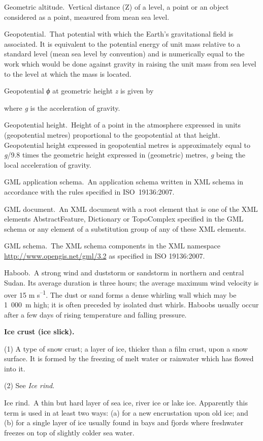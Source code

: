 Geometric altitude. Vertical distance (Z) of a level, a point or an object considered as a point, measured from mean sea level.

Geopotential. That potential with which the Earth's gravitational field is associated. It is equivalent to the potential energy of unit mass relative to a standard level (mean sea level by convention) and is numerically equal to the work which would be done against gravity in raising the unit mass from sea level to the level at which the mass is located.

Geopotential \emph{ϕ} at geometric height \emph{z} is given by

where \emph{g} is the acceleration of gravity.

Geopotential height. Height of a point in the atmosphere expressed in units (geopotential metres) proportional to the geopotential at that height. Geopotential height expressed in geopotential metres is approximately equal to \emph{g}/9.8 times the geometric height expressed in (geometric) metres, \emph{g} being the local acceleration of gravity.

GML application schema. An application schema written in XML schema in accordance with the rules specified in ISO~19136:2007.

GML document. An XML document with a root element that is one of the XML elements AbstractFeature, Dictionary or TopoComplex specified in the GML schema or any element of a substitution group of any of these XML elements.

GML schema. The XML schema components in the XML namespace \url{http://www.opengis.net/gml/3.2} as specified in ISO 19136:2007.

Haboob. A strong wind and duststorm or sandstorm in northern and central Sudan. Its average duration is three hours; the average maximum wind velocity is over 15 m s\textsuperscript{--1}. The dust or sand forms a dense whirling wall which may be 1~000~m high; it is often preceded by isolated dust whirls. Haboobs usually occur after a few days of rising temperature and falling pressure.

\textbf{Ice crust (ice slick).}

(1) A type of snow crust; a layer of ice, thicker than a film crust, upon a snow surface. It is formed by the freezing of melt water or rainwater which has flowed into it.

(2) See \emph{Ice rind}.

Ice rind. A thin but hard layer of sea ice, river ice or lake ice. Apparently this term is used in at least two ways: (a) for a new encrustation upon old ice; and (b) for a single layer of ice usually found in bays and fjords where freshwater freezes on top of slightly colder sea water.

